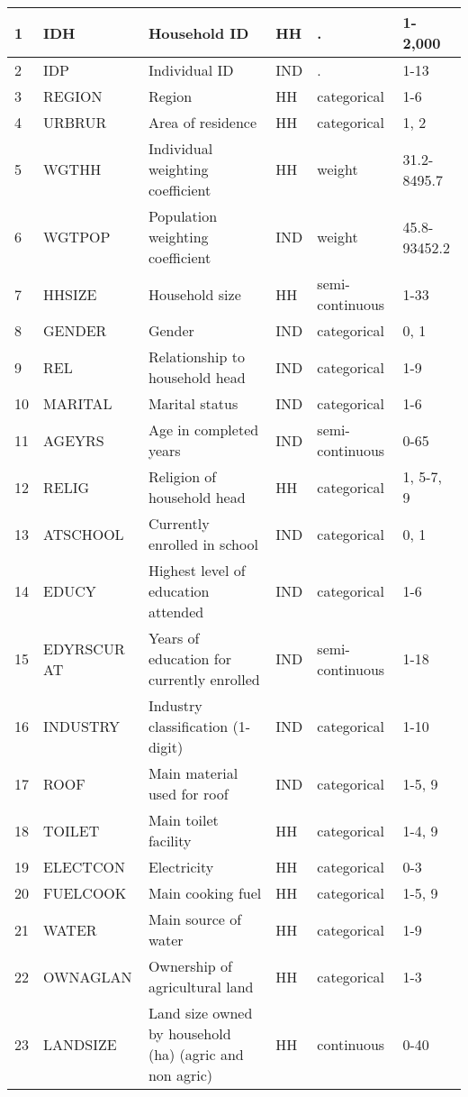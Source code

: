 \documentclass[letterpaper,10pt,english]{sphinxmanual}
\begin{document}
\begin{savenotes}
\begin{longtable}[c]{|l|l|l|l|l|l|}
1
&
IDH
&
Household ID
&
HH
&
.
&
1-2,000
\\
\hline
2
&
IDP
&
Individual ID
&
IND
&
.
&
1-13
\\
\hline
3
&
REGION
&
Region
&
HH
&
categorical
&
1-6
\\
\hline
4
&
URBRUR
&
Area of residence
&
HH
&
categorical
&
1, 2
\\
\hline
5
&
WGTHH
&
Individual weighting coefficient
&
HH
&
weight
&
31.2-8495.7
\\
\hline
6
&
WGTPOP
&
Population weighting coefficient
&
IND
&
weight
&
45.8-93452.2
\\
\hline
7
&
HHSIZE
&
Household size
&
HH
&
semi-continuous
&
1-33
\\
\hline
8
&
GENDER
&
Gender
&
IND
&
categorical
&
0, 1
\\
\hline
9
&
REL
&
Relationship to household head
&
IND
&
categorical
&
1-9
\\
\hline
10
&
MARITAL
&
Marital status
&
IND
&
categorical
&
1-6
\\
\hline
11
&
AGEYRS
&
Age in completed years
&
IND
&
semi-continuous
&
0-65
\\
\hline
12
&
RELIG
&
Religion of household head
&
HH
&
categorical
&
1, 5-7, 9
\\
\hline
13
&
ATSCHOOL
&
Currently enrolled in school
&
IND
&
categorical
&
0, 1
\\
\hline
14
&
EDUCY
&
Highest
level of education attended
&
IND
&
categorical
&
1-6
\\
\hline
15
&
EDYRSCUR
AT
&
Years of
education for currently enrolled
&
IND
&
semi-continuous
&
1-18
\\
\hline
16
&
INDUSTRY
&
Industry
classification (1-digit)
&
IND
&
categorical
&
1-10
\\
\hline
17
&
ROOF
&
Main
material used for roof
&
IND
&
categorical
&
1-5, 9
\\
\hline
18
&
TOILET
&
Main
toilet facility
&
HH
&
categorical
&
1-4, 9
\\
\hline
19
&
ELECTCON
&
Electricity
&
HH
&
categorical
&
0-3
\\
\hline
20
&
FUELCOOK
&
Main
cooking fuel
&
HH
&
categorical
&
1-5, 9
\\
\hline
21
&
WATER
&
Main
source of water
&
HH
&
categorical
&
1-9
\\
\hline
22
&
OWNAGLAN
&
Ownership
of agricultural land
&
HH
&
categorical
&
1-3
\\
\hline
23
&
LANDSIZE
&
Land size owned by household (ha)
(agric and non agric)
&
HH
&
continuous
&
0-40
\\

\end{longtable}
\end{savenotes}
\end{document}
